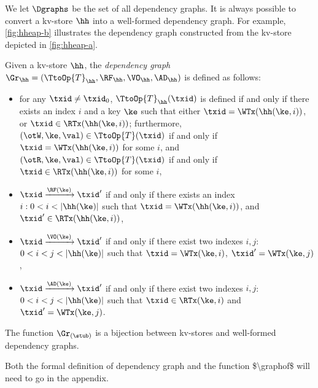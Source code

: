 We let $\Dgraphs$ be the set of all dependency graphs.
It is always possible to convert a kv-store $\hh$ into a well-formed dependency 
graph. For example, \cref{fig:hheap-b} illustrates the dependency graph constructed 
from the kv-store depicted in \cref{fig:hheap-a}.

\begin{definition}
\label{def:kv2graph}
Given a kv-store $\hh$, the \emph{dependency graph} $\Gr_{\hh} = (\TtoOp{T}_{\hh}, \RF_{\hh}, 
\VO_{\hh}, \AD_{\hh})$ is defined as follows: 
\begin{itemize}
\item for any $\txid \neq \txid_0$, $\TtoOp{T}_{\hh}(\txid)$ is defined if and only if there exists an index $i$ and a key 
$\ke$ such that either $\txid = \WTx(\hh(\ke, i))$, or $\txid \in \RTx(\hh(\ke,i))$; furthermore, 
$(\otW, \ke, \val) \in \TtoOp{T}(\txid)$ if and only 
if $\txid = \WTx(\hh(\ke, i))$ for some $i$, and 
$(\otR, \ke, \val) \in \TtoOp{T}(\txid)$ if and only if $\txid \in \RTx(\hh(\ke, i))$ for some $i$, 
\item $\txid \xrightarrow{\RF(\ke)} \txid'$ if and only if there exists an index $i: 0 < i < \lvert \hh(\ke) \rvert$ 
such that $\txid = \WTx(\hh(\ke, i))$, and $\txid' \in \RTx(\hh(\ke, i))$, 
\item $\txid \xrightarrow{\VO(\ke)} \txid'$ if and only if there exist two indexes $i,j$: $0 < i < j < \lvert \hh(\ke) \rvert$ 
such that $\txid = \WTx(\ke, i)$, $\txid' = \WTx(\ke, j)$, 
\item $\txid \xrightarrow{\AD(\ke)} \txid'$ if and only if there exist two indexes $i,j$: $0 < i < j < \lvert \hh(\ke) \rvert$ 
such that $\txid \in \RTx(\ke, i)$ and $\txid' = \WTx(\ke, j)$.
\end{itemize}
\end{definition}

\begin{theorem}
\label{thm:kv2graph}
The function $\Gr_{(\stub)}$ is a bijection between kv-stores and well-formed dependency graphs.
\end{theorem}

\ac{Both the formal definition of dependency graph and the function $\graphof$ will need to go in the appendix.}
